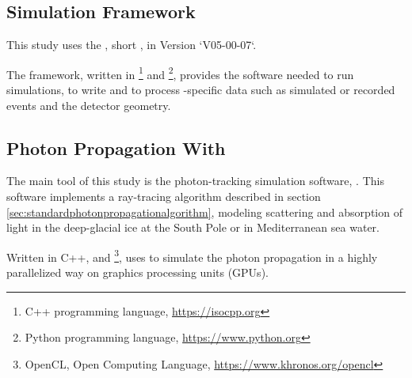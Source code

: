 
\label{sec:tools}

\subsection{\icecube Simulation Framework}

This study uses the , short \icesim, in Version `V05-00-07`.

The framework, written in \footnote{C++ programming language, \url{https://isocpp.org}} and \footnote{Python programming language, \url{https://www.python.org}}, provides the software needed to run simulations, to write and to process \icecube-specific data such as simulated or recorded events and the detector geometry.



\subsection{Photon Propagation With \clsim}

The main tool of this study is the photon-tracking simulation software, \clsim. This software implements a ray-tracing algorithm described in section \ref{sec:standardphotonpropagationalgorithm}, modeling scattering and absorption of light in the deep-glacial ice at the South Pole or in Mediterranean sea water. \cite{clsimreadme}

Written in C++,  and \footnote{OpenCL, Open Computing Language, \url{https://www.khronos.org/opencl}}, \clsim uses  to simulate the photon propagation in a highly parallelized way on graphics processing units (GPUs).

